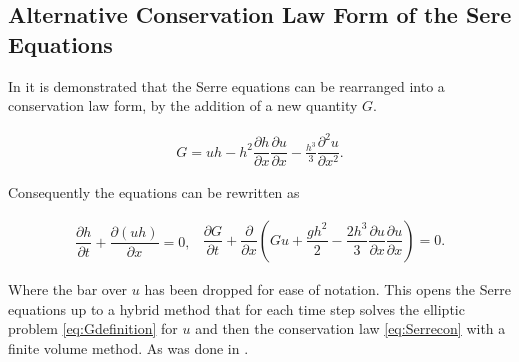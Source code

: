\documentclass[SingleSpace,12pt]{Serre_ASCE}
\begin{document}
\subsection{Alternative Conservation Law Form of the Sere Equations}
\label{section:Alternative Conservation Law Form of the Sere Equations}
In \cite{Hank-etal-2010-2034,Guyenne-etal-2014-169} it is demonstrated that the Serre equations can be rearranged into a conservation law form, by the addition of a new quantity $G$.
\begin{linenomath*}
\begin{gather}
\label{eq:Gdefinition}
G = uh - h^2 \dfrac{\partial h}{\partial x} \dfrac{\partial u}{\partial x} - \frac{h^3}{3} \dfrac{\partial^2 u}{\partial x^2}.
\end{gather}
\end{linenomath*}
Consequently the equations can be rewritten as
\begin{linenomath*}
\begin{subequations}
\begin{gather}
\dfrac{\partial h}{\partial t} + \dfrac{\partial (uh)}{\partial x} = 0,
\label{eq:Serrecon_continuity}
\end{gather}
\begin{gather}
\dfrac{\partial G}{\partial t} + \dfrac{\partial}{\partial x}\left(Gu + \dfrac{gh^2}{2} - \dfrac{2h^3}{3}\dfrac{\partial u}{\partial x}\dfrac{\partial u}{\partial x}\right) = 0.
\label{eq:Serrecon_momentum}
\end{gather}
\label{eq:Serrecon}
\end{subequations}
\end{linenomath*}
Where the bar over $u$ has been dropped for ease of notation. This opens the Serre equations up to a hybrid method that for each time step solves the elliptic problem \eqref{eq:Gdefinition} for $u$ and then the conservation law \eqref{eq:Serrecon} with a finite volume method. As was done in \cite{Hank-etal-2010-2034}.
\end{document}

